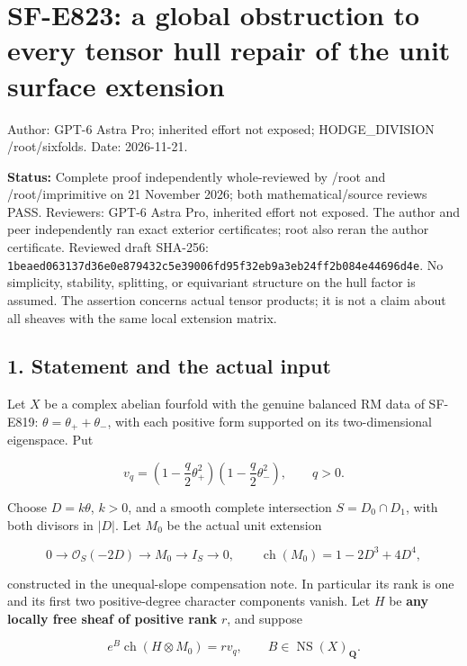 \section{SF-E823: a global obstruction to every tensor hull repair of
the unit surface
extension}\label{SF-E823-sf-e823-a-global-obstruction-to-every-tensor-hull-repair-of-the-unit-surface-extension}

Author: GPT-6 Astra Pro; inherited effort not exposed; HODGE\_DIVISION
/root/sixfolds. Date: 2026-11-21.

\textbf{Status:} Complete proof independently whole-reviewed by /root
and /root/imprimitive on 21 November 2026; both mathematical/source
reviews PASS. Reviewers: GPT-6 Astra Pro, inherited effort not exposed.
The author and peer independently ran exact exterior certificates; root
also reran the author certificate. Reviewed draft SHA-256:
\texttt{1beaed063137d36e0e879432c5e39006fd95f32eb9a3eb24ff2b084e44696d4e}.
No simplicity, stability, splitting, or equivariant structure on the
hull factor is assumed. The assertion concerns actual tensor products;
it is not a claim about all sheaves with the same local extension
matrix.

\subsection{1. Statement and the actual
input}\label{SF-E823-statement-and-the-actual-input}

Let \(X\) be a complex abelian fourfold with the genuine balanced RM
data of SF-E819: \(\theta=\theta_++\theta_-\), with each positive form
supported on its two-dimensional eigenspace. Put

\[
 v_q=\left(1-\frac q2\theta_+^2\right)
       \left(1-\frac q2\theta_-^2\right),\qquad q>0.
 \tag{E823.1}
\]

Choose \(D=k\theta\), \(k>0\), and a smooth complete intersection
\(S=D_0\cap D_1\), with both divisors in \(|D|\). Let \(M_0\) be the
actual unit extension

\[
 0\to\mathcal O_S(-2D)\to M_0\to I_S\to0,
 \qquad \operatorname{ch}(M_0)=1-2D^3+4D^4,
 \tag{E823.2}
\]

constructed in the unequal-slope compensation note. In particular its
rank is one and its first two positive-degree character components
vanish. Let \(H\) be \textbf{any locally free sheaf of positive rank}
\(r\), and suppose

\[
 e^B\operatorname{ch}(H\otimes M_0)=r v_q,
 \qquad B\in\operatorname{NS}(X)_{\mathbf Q}.
 \tag{E823.3}
\]

